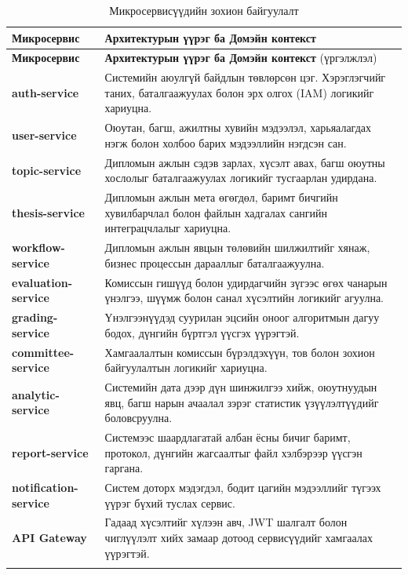 \begin{longtable}{p{3.5cm} p{12.5cm}}
\caption{Микросервисүүдийн зохион байгуулалт} \label{tab:ms} \\
\toprule
\textbf{Микросервис} & \textbf{Архитектурын үүрэг ба Домэйн контекст} \\ 
\midrule
\endfirsthead
\toprule
\textbf{Микросервис} & \textbf{Архитектурын үүрэг ба Домэйн контекст} (үргэлжлэл) \\ 
\midrule
\endhead
\bottomrule
\endfoot
\textbf{auth-service} & Системийн аюулгүй байдлын төвлөрсөн цэг. Хэрэглэгчийг таних, баталгаажуулах болон эрх олгох (IAM) логикийг хариуцна. \\ \addlinespace

\textbf{user-service} & Оюутан, багш, ажилтны хувийн мэдээлэл, харьяалагдах нэгж болон холбоо барих мэдээллийн нэгдсэн сан. \\ \addlinespace

\textbf{topic-service} & Дипломын ажлын сэдэв зарлах, хүсэлт авах, багш оюутны хослолыг баталгаажуулах логикийг тусгаарлан удирдана. \\ \addlinespace

\textbf{thesis-service} & Дипломын ажлын мета өгөгдөл, баримт бичгийн хувилбарчлал болон файлын хадгалах сангийн интеграцчлалыг хариуцна. \\ \addlinespace

\textbf{workflow-service} & Дипломын ажлын явцын төлөвийн шилжилтийг хянаж, бизнес процессын дарааллыг баталгаажуулна. \\ \addlinespace

\textbf{evaluation-service} & Комиссын гишүүд болон удирдагчийн зүгээс өгөх чанарын үнэлгээ, шүүмж болон санал хүсэлтийн логикийг агуулна. \\ \addlinespace

\textbf{grading-service} & Үнэлгээнүүдэд суурилан эцсийн оноог алгоритмын дагуу бодох, дүнгийн бүртгэл үүсгэх үүрэгтэй. \\ \addlinespace

\textbf{committee-service} & Хамгаалалтын комиссын бүрэлдэхүүн, тов болон зохион байгуулалтын логикийг хариуцна. \\ \addlinespace

\textbf{analytic-service} & Системийн дата дээр дүн шинжилгээ хийж, оюутнуудын явц, багш нарын ачаалал зэрэг статистик үзүүлэлтүүдийг боловсруулна. \\ \addlinespace

\textbf{report-service} & Системээс шаардлагатай албан ёсны бичиг баримт, протокол, дүнгийн жагсаалтыг файл хэлбэрээр үүсгэн гаргана. \\ \addlinespace

\textbf{notification-service} & Систем доторх мэдэгдэл, бодит цагийн мэдээллийг түгээх үүрэг бүхий туслах сервис. \\ \addlinespace

\textbf{API Gateway} & Гадаад хүсэлтийг хүлээн авч, JWT шалгалт болон чиглүүлэлт хийх замаар дотоод сервисүүдийг хамгаалах үүрэгтэй. \\ \addlinespace
\end{longtable}

